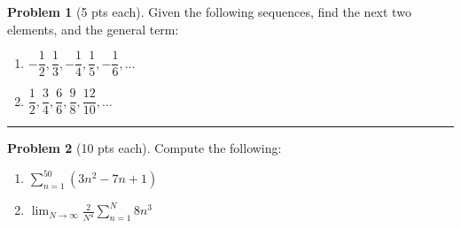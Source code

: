 \documentclass[12pt]{article}
\theoremstyle{definition}
\newtheorem{problem}{Problem}
\begin{document}
\begin{problem}[5 pts each] 
Given the following sequences, find the next two elements, and the general term:
\begin{enumerate}
\item $-\dfrac{1}{2},\dfrac{1}{3},-\dfrac{1}{4},\dfrac{1}{5},-\dfrac{1}{6},\dotsc$

\vspace{0.5cm}
\begin{flushright}
\end{flushright}
\item $\dfrac{1}{2}, \dfrac{3}{4}, \dfrac{6}{6}, \dfrac{9}{8}, \dfrac{12}{10}, \dotsc$

\vspace{0.5cm}
\begin{flushright}
\end{flushright}
\end{enumerate}
\end{problem}
\hrule

\begin{problem}[10 pts each] 
Compute the following:
\begin{enumerate}
\item $\displaystyle{\sum_{n=1}^{50} (3n^2-7n+1)}$
\vspace{2cm}
\begin{flushright}
\end{flushright}
\item $\displaystyle{\lim_{N\to \infty} \frac{2}{N^4} \sum_{n=1}^N  8n^3}$
\vspace{3.5cm}
\begin{flushright}
\end{flushright}
\end{enumerate}
\end{problem}
\newpage
\end{document}
